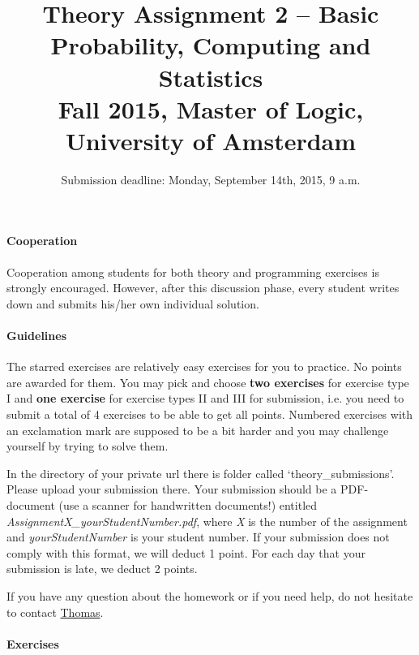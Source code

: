\documentclass{article}
\title{Theory Assignment 2 -- Basic Probability, Computing and Statistics\\[2mm]
\large{Fall 2015, Master of Logic, University of Amsterdam}}
\author{}
\date{Submission deadline: Monday, September 14th, 2015, 9 a.m.}
\begin{document}
\maketitle

\paragraph{Cooperation}
Cooperation among students for both theory and programming exercises
is strongly encouraged.  However, after this discussion phase, every student writes down and submits his/her own individual solution.

\paragraph{Guidelines}
	The starred exercises are relatively easy exercises for you to practice. No points are awarded for them. You may pick and choose {\bf two exercises} for exercise type I and {\bf one exercise} for exercise types II and III for submission, i.e. you need to submit a total of 4 exercises to be able to get all points. Numbered exercises with an exclamation mark are supposed to be a bit harder and you may challenge yourself by trying to solve them.

In the directory of your private url there is folder called `theory\_submissions'. Please upload your submission there. Your submission should be a PDF-document (use a scanner for handwritten documents!) entitled \textit{AssignmentX\_yourStudentNumber.pdf}, where \textit{X} is the number of the assignment and \textit{yourStudentNumber} is your student number. If your submission does not comply with this format, we will deduct 1 point. For each day that your submission is late, we deduct 2 points.

If you have any question about the homework or if you need help, do not hesitate to contact \href{mailto:T.S.Brochhagen@uva.nl}{Thomas}.

\paragraph{Exercises}
\end{document}

